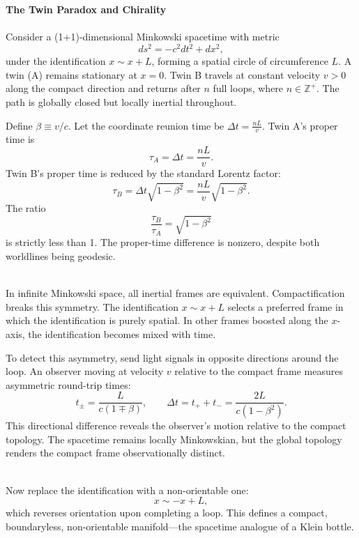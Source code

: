 \begin{technical}
{\Large\textbf{The Twin Paradox and Chirality}}\\[0.3em]

\\[0.5em]
Consider a (1+1)-dimensional Minkowski spacetime with metric
\[
ds^2 = -c^2 dt^2 + dx^2,
\]
under the identification \(x \sim x + L\), forming a spatial circle of circumference \(L\). A twin (A) remains stationary at \(x = 0\). Twin B travels at constant velocity \(v > 0\) along the compact direction and returns after $n$ full loops, where \(n \in \mathbb{Z}^+\). The path is globally closed but locally inertial throughout.

Define \(\beta \equiv v/c\). Let the coordinate reunion time be \(\Delta t = \frac{nL}{v}\). Twin A's proper time is
\[
\tau_A = \Delta t = \frac{nL}{v}.
\]
Twin B's proper time is reduced by the standard Lorentz factor:
\[
\tau_B = \Delta t \sqrt{1 - \beta^2} = \frac{nL}{v} \sqrt{1 - \beta^2}.
\]
The ratio
\[
\frac{\tau_B}{\tau_A} = \sqrt{1 - \beta^2}
\]
is strictly less than 1. The proper-time difference is nonzero, despite both worldlines being geodesic.

\vspace{0.5em}
\\[0.5em]
In infinite Minkowski space, all inertial frames are equivalent. Compactification breaks this symmetry. The identification \(x \sim x + L\) selects a preferred frame in which the identification is purely spatial. In other frames boosted along the $x$-axis, the identification becomes mixed with time.

To detect this asymmetry, send light signals in opposite directions around the loop. An observer moving at velocity \(v\) relative to the compact frame measures asymmetric round-trip times:
\[
t_{\pm} = \frac{L}{c(1 \mp \beta)}, \qquad \Delta t = t_+ + t_- = \frac{2L}{c(1 - \beta^2)}.
\]
This directional difference reveals the observer's motion relative to the compact topology. The spacetime remains locally Minkowskian, but the global topology renders the compact frame observationally distinct.

\vspace{0.5em}
\\[0.5em]
Now replace the identification with a non-orientable one:
\[
x \sim -x + L,
\]
which reverses orientation upon completing a loop. This defines a compact, boundaryless, non-orientable manifold—the spacetime analogue of a Klein bottle.


\end{technical}
